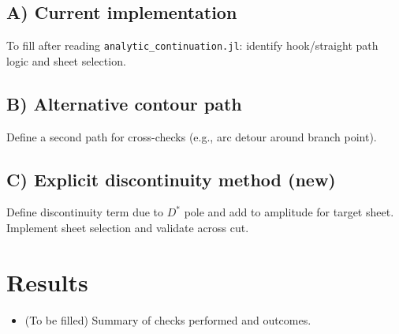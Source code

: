 \documentclass{article}
\begin{document}
\subsection*{A) Current implementation}
To fill after reading \texttt{analytic\_continuation.jl}: identify hook/straight path logic and sheet selection.

\subsection*{B) Alternative contour path}
Define a second path for cross-checks (e.g., arc detour around branch point).

\subsection*{C) Explicit discontinuity method (new)}
Define discontinuity term due to $D^*$ pole and add to amplitude for target sheet. Implement sheet selection and validate across cut.

\section*{Results}
\begin{itemize}
  \item (To be filled) Summary of checks performed and outcomes.
\end{itemize}
\end{document}
